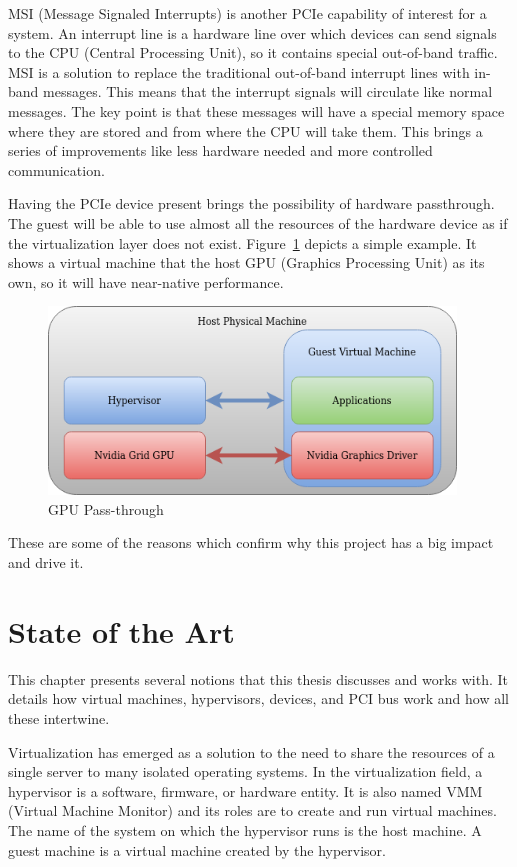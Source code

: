 \documentclass[12pt, a4paper]{report}
\begin{document}
MSI (Message Signaled Interrupts) is another PCIe capability of interest for a system. An interrupt line is a hardware line over which devices can send signals to the CPU (Central Processing Unit), so it contains special out-of-band traffic. MSI is a solution to replace the traditional out-of-band interrupt lines with in-band messages. This means that the interrupt signals will circulate like normal messages. The key point is that these messages will have a special memory space where they are stored and from where the CPU will take them. This brings a series of improvements like less hardware needed and more controlled communication.

Having the PCIe device present brings the possibility of hardware passthrough. The guest will be able to use almost all the resources of the hardware device as if the virtualization layer does not exist. Figure~\ref{fig:gpu-passthrough} depicts a simple example. It shows a virtual machine that the host GPU (Graphics Processing Unit) as its own, so it will have near-native performance.

\begin{figure}[H]
\centering
\includegraphics[height=5cm, keepaspectratio]{pics/gpu-passthrough.png}
  \caption{{GPU Pass-through}}
  \label{fig:gpu-passthrough}
\end{figure}

These are some of the reasons which confirm why this project has a big impact and drive it.


\chapter{State of the Art}\label{State of the Art}

This chapter presents several notions that this thesis discusses and works with. It details how virtual machines, hypervisors, devices, and PCI bus work and how all these intertwine.

Virtualization has emerged as a solution to the need to share the resources of a single server to many isolated operating systems. In the virtualization field, a hypervisor is a software, firmware, or hardware entity. It is also named VMM (Virtual Machine Monitor) and its roles are to create and run virtual machines. The name of the system on which the hypervisor runs is the host machine. A guest machine is a virtual machine created by the hypervisor.
\end{document}
